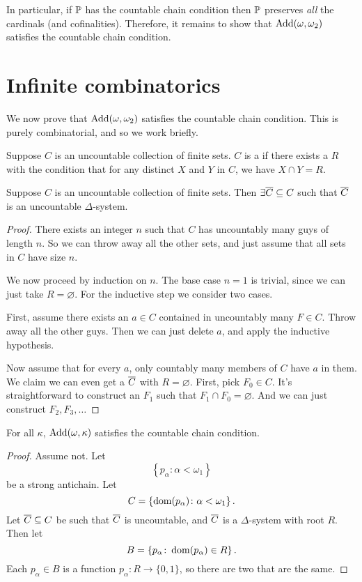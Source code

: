 In particular, if $\mathbb P$ has the countable chain condition then $\mathbb P$ preserves \emph{all} the cardinals (and cofinalities).
Therefore, it remains to show that $\operatorname{Add}(\omega, \omega_2)$ satisfies the countable chain condition.

\section{Infinite combinatorics}
We now prove that $\operatorname{Add}(\omega, \omega_2)$ satisfies the countable chain condition.
This is purely combinatorial, and so we work briefly.

\begin{definition}
	Suppose $C$ is an uncountable collection of finite sets.
	$C$ is a  if there exists a  $R$
	with the condition that for any distinct $X$ and $Y$
	in $C$, we have $X \cap Y = R$.
\end{definition}

\begin{lemma}
	 Suppose $C$ is an uncountable collection of finite sets.
	Then $\exists \overline C \subseteq C$ such that $\overline C$ is an uncountable $\Delta$-system.
\end{lemma}
\begin{proof}
	There exists an integer $n$ such that $C$ has uncountably many guys of length $n$.
	So we can throw away all the other sets, and just assume that all sets in $C$ have size $n$.

	We now proceed by induction on $n$.
	The base case $n=1$ is trivial, since we can just take $R = \varnothing$.
	For the inductive step we consider two cases.

	First, assume there exists an $a \in C$ contained in uncountably many $F \in C$.
	Throw away all the other guys.
	Then we can just delete $a$, and apply the inductive hypothesis.

	Now assume that for every $a$, only countably many members of $C$ have $a$ in them.
	We claim we can even get a $\overline C$ with $R = \varnothing$.
	First, pick $F_0 \in C$.
	It's straightforward to construct an $F_1$ such that $F_1 \cap F_0 = \varnothing$.
	And we can just construct $F_2, F_3, \dots$
\end{proof}

\begin{lemma}
	For all $\kappa$, $\operatorname{Add}(\omega, \kappa)$ satisfies the countable chain condition.
\end{lemma}
\begin{proof}
	Assume not. Let
	\[ \left\{ p_\alpha \colon \alpha < \omega_1 \right\} \]
	be a strong antichain.  Let
	\[ C = \left\{ \operatorname{dom}(p_\alpha) \colon \alpha < \omega_1 \right\}. \]
	Let $\overline C \subseteq C$ be such that $\overline C$ is uncountable, and $\overline C$ is a $\Delta$-system with root $R$.
	Then let
	\[ B = \left\{ p_\alpha \colon \operatorname{dom}(p_\alpha) \in R \right\}. \]
	Each $p_\alpha \in B$ is a function $p_\alpha \colon R \to \{0,1\}$,
	so there are two that are the same.
\end{proof}

